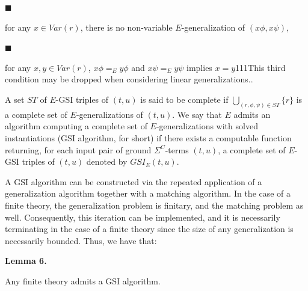 \documentclass[10pt,a4paper]{amsart}
\begin{document}
 
 
\par\noindent  $\blacksquare$ 
 
for any $x\in\mathit{Var}(r)$, there is no non-variable $E$-generalization of $(x\phi,x\psi)$,\par
 
 
 
\par\noindent  $\blacksquare$ 
 
for any $x,y\in\mathit{Var}(r)$, $x\phi=_{E}y\phi$ and $x\psi=_{E}y\psi$ implies $x=y$111This third condition may be dropped when considering linear generalizations..\par
 
 
  
A set $ST$ of $E$-GSI triples of $(t,u)$ is said to be complete if $\bigcup_{(r,\phi,\psi)\in ST}\{r\}$ is a complete set of $E$-generalizations of $(t,u)$. We say that $E$ admits an algorithm computing a complete set of $E$-generalizations with solved instantiations (GSI algorithm, for short) if there exists a computable function returning, for each input pair of ground ${\Sigma}^{C}$-terms $(t,u)$, a complete set of $E$-GSI triples of $(t,u)$ denoted by $GSI_{E}(t,u)$.\par
 
 
 
 
A GSI algorithm can be constructed via the repeated application of a generalization algorithm together with a matching algorithm. In the case of a finite theory, the generalization problem is finitary, and the matching problem as well. Consequently, this iteration can be implemented, and it is necessarily terminating in the case of a finite theory since the size of any generalization is necessarily bounded. Thus, we have that:\par
 
 
 
\par\medskip\noindent\textbf{Lemma 6.}\par
 
 
Any finite theory admits a GSI algorithm.\par
 
\end{document}
